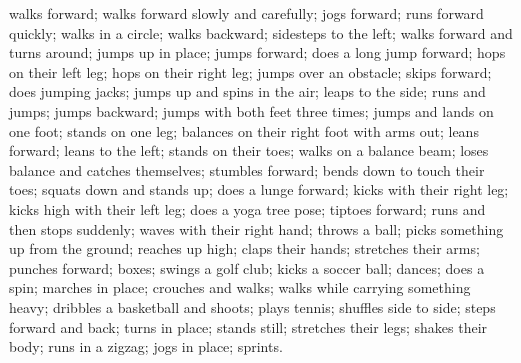 {\small walks forward; walks forward slowly and carefully; jogs forward; runs forward quickly; walks in a circle; walks backward; sidesteps to the left; walks forward and turns around; jumps up in place; jumps forward; does a long jump forward; hops on their left leg; hops on their right leg; jumps over an obstacle; skips forward; does jumping jacks; jumps up and spins in the air; leaps to the side; runs and jumps; jumps backward; jumps with both feet three times; jumps and lands on one foot; stands on one leg; balances on their right foot with arms out; leans forward; leans to the left; stands on their toes; walks on a balance beam; loses balance and catches themselves; stumbles forward; bends down to touch their toes; squats down and stands up; does a lunge forward; kicks with their right leg; kicks high with their left leg; does a yoga tree pose; tiptoes forward; runs and then stops suddenly; waves with their right hand; throws a ball; picks something up from the ground; reaches up high; claps their hands; stretches their arms; punches forward; boxes; swings a golf club; kicks a soccer ball; dances; does a spin; marches in place; crouches and walks; walks while carrying something heavy; dribbles a basketball and shoots; plays tennis; shuffles side to side; steps forward and back; turns in place; stands still; stretches their legs; shakes their body; runs in a zigzag; jogs in place; sprints.}
